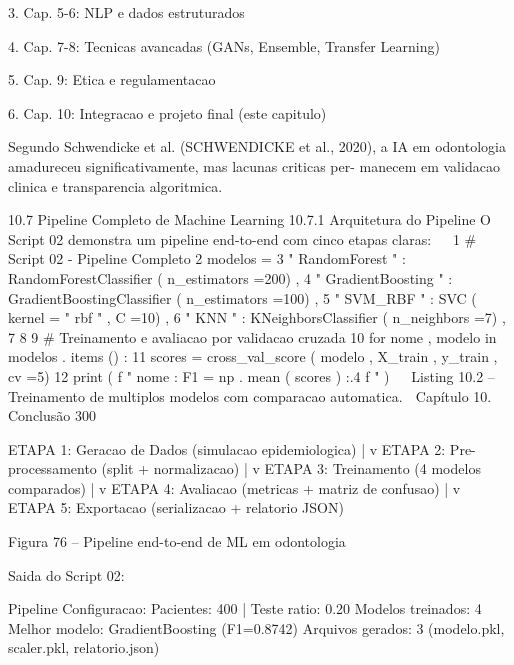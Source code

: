      3. Cap. 5-6: NLP e dados estruturados

     4. Cap. 7-8: Tecnicas avancadas (GANs, Ensemble, Transfer Learning)

     5. Cap. 9: Etica e regulamentacao

     6. Cap. 10: Integracao e projeto final (este capitulo)

                              Segundo Schwendicke et al. (SCHWENDICKE et al., 2020), a IA em
                              odontologia amadureceu significativamente, mas lacunas criticas per-
                              manecem em validacao clinica e transparencia algoritmica.



  10.7      Pipeline Completo de Machine Learning
  10.7.1     Arquitetura do Pipeline
  O Script 02 demonstra um pipeline end-to-end com cinco etapas claras:
                                                                                                    
 1 # Script 02 - Pipeline Completo
 2 modelos = {
 3     " RandomForest " : RandomForestClassifier ( n_estimators =200) ,
 4     " GradientBoosting " : GradientBoostingClassifier ( n_estimators =100) ,
 5     " SVM_RBF " : SVC ( kernel = " rbf " , C =10) ,
 6     " KNN " : KNeighborsClassifier ( n_neighbors =7) ,
 7 }
 8
 9 # Treinamento e avaliacao por validacao cruzada
10 for nome , modelo in modelos . items () :
11     scores = cross_val_score ( modelo , X_train , y_train , cv =5)
12     print ( f " { nome }: F1 ={ np . mean ( scores ) :.4 f } " )
                                                                                                    
      Listing 10.2 – Treinamento de multiplos modelos com comparacao automatica.
  Capítulo 10. Conclusão                                                            300


  ETAPA 1: Geracao de Dados (simulacao epidemiologica)
      |
      v
  ETAPA 2: Pre-processamento (split + normalizacao)
      |
      v
  ETAPA 3: Treinamento (4 modelos comparados)
      |
      v
  ETAPA 4: Avaliacao (metricas + matriz de confusao)
      |
      v
  ETAPA 5: Exportacao (serializacao + relatorio JSON)

                  Figura 76 – Pipeline end-to-end de ML em odontologia


     Saida do Script 02:

       Pipeline Configuracao:
         Pacientes: 400 | Teste ratio: 0.20
       Modelos treinados: 4
       Melhor modelo: GradientBoosting (F1=0.8742)
       Arquivos gerados: 3 (modelo.pkl, scaler.pkl, relatorio.json)


